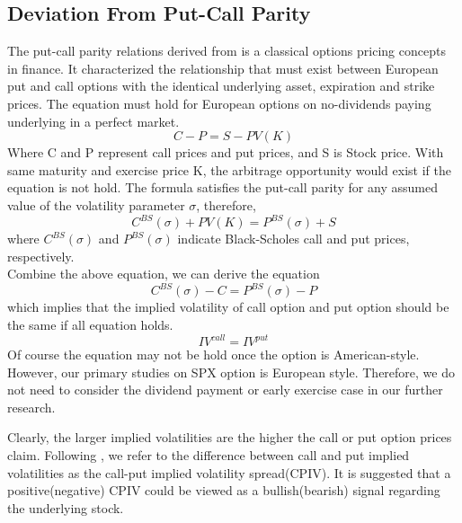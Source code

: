 
\subsection{Deviation From Put-Call Parity}
The put-call parity relations derived from \textcite{stoll1969relationship} is a classical options pricing concepts in finance. It characterized the relationship that must exist between European put and call options with the identical underlying asset, expiration and strike prices. The equation must hold for European options on no-dividends paying underlying in a perfect market. 
\begin{equation}
C-P = S - PV(K)
\end{equation}
Where C and P represent call prices and put prices, and S is Stock price. With same maturity and exercise price K, the arbitrage opportunity would exist if the equation is not hold. The \textcite{black1973pricing} formula satisfies the put-call parity for any assumed value of the volatility parameter $\sigma$, therefore, 
\begin{equation}
C^{BS}(\sigma ) + PV(K) = P^{BS}(\sigma ) + S
\end{equation}
where $C^{BS}(\sigma )$ and $P^{BS}(\sigma )$ indicate Black-Scholes call and put prices, respectively. 
\\
Combine the above equation, we can derive the equation
\begin{equation}
C^{BS}(\sigma ) - C = P^{BS}(\sigma ) - P
\end{equation}
which implies that the implied volatility of call option and put option should be the same if all equation holds. 
\begin{equation}
IV^{call} = IV^{put}
\end{equation}
Of course the equation may not be hold once the option is American-style. However, our primary studies on SPX option is European style. Therefore, we do not need to consider the dividend payment or early exercise case in our further research. 

Clearly, the larger implied volatilities are the higher the call or put option prices claim. Following \textcite{amin2004index}, we refer to the difference between call and put implied volatilities as the call-put implied volatility spread(CPIV). It is suggested that a positive(negative) CPIV could be viewed as a bullish(bearish) signal regarding the underlying stock. 

